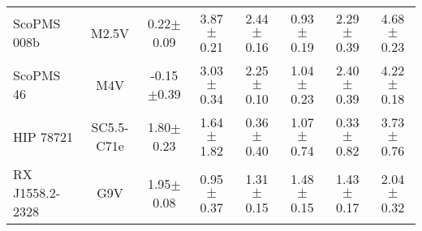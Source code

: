 \begin{table}
\begin{center}
\begin{tabular}{l|c|c|c|c|c|c|c}
ScoPMS 008b & M2.5V & 0.22$\pm$0.09 & 3.87$\pm$0.21 & 2.44$\pm$0.16 & 0.93$\pm$0.19 & 2.29$\pm$0.39 & 4.68$\pm$0.23 \\
ScoPMS 46 & M4V & -0.15$\pm$0.39 & 3.03$\pm$0.34 & 2.25$\pm$0.10 & 1.04$\pm$0.23 & 2.40$\pm$0.39 & 4.22$\pm$0.18 \\
HIP 78721 & SC5.5-C71e & 1.80$\pm$0.23 & 1.64$\pm$1.82 & 0.36$\pm$0.40 & 1.07$\pm$0.74 & 0.33$\pm$0.82 & 3.73$\pm$0.76 \\
RX J1558.2-2328 & G9V & 1.95$\pm$0.08 & 0.95$\pm$0.37 & 1.31$\pm$0.15 & 1.48$\pm$0.15 & 1.43$\pm$0.17 & 2.04$\pm$0.32 \\
\end{tabular}
\end{center}
\end{table}
